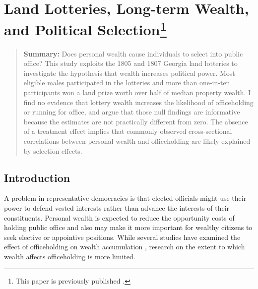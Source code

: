 \chapter[Land Lotteries, Long-term Wealth, and Political Selection]{Land Lotteries, Long-term Wealth, and Political Selection\footnote{This paper is previously published \citep{poulos2019land}.}}\label{ga-lottery}

\begin{quote}  
	\textbf{Summary:} Does personal wealth cause individuals to select into public office? This study exploits the 1805 and 1807 Georgia land lotteries to investigate the hypothesis that wealth increases political power. Most eligible males participated in the lotteries and more than one-in-ten participants won a land prize worth over half of median property wealth. I find no evidence that lottery wealth increases the likelihood of officeholding or running for office, and argue that those null findings are informative because the estimates are not practically different from zero. The absence of a treatment effect implies that commonly observed cross-sectional correlations between personal wealth and officeholding are likely explained by selection effects.
\end{quote}

\section{Introduction}

\noindent
A problem in representative democracies is that elected officials might use their power to defend vested interests rather than advance the interests of their constituents. Personal wealth is expected to reduce the opportunity costs of holding public office and also may make it more important for wealthy citizens to seek elective or appointive positions. While several studies have examined the effect of officeholding on wealth accumulation  \citep[e.g.,][]{eggers2009,querubin2013,truex2013}, research on the extent to which wealth affects officeholding is more limited. 


